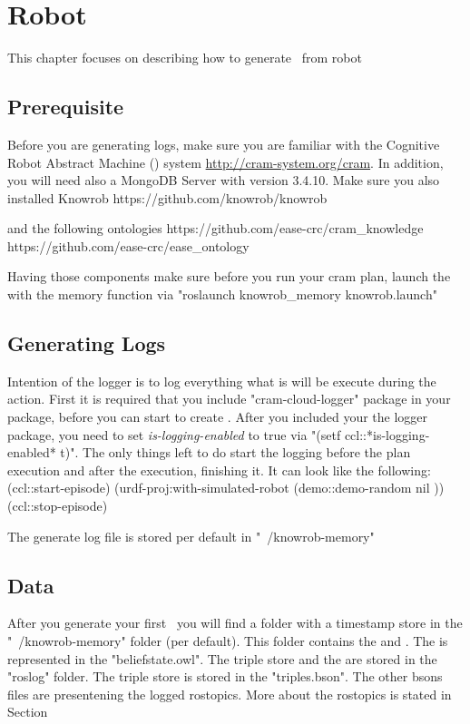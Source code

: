 \section{Robot \neems}

This chapter focuses on describing how to generate \neems~from robot 

\subsection{Prerequisite}

Before you are generating logs, make sure you are familiar with the Cognitive Robot Abstract Machine (\cram) system \url{http://cram-system.org/cram}.
In addition, you will need also a MongoDB Server with version 3.4.10.
Make sure you also installed Knowrob
https://github.com/knowrob/knowrob

and the following ontologies
https://github.com/ease-crc/cram\_knowledge
https://github.com/ease-crc/ease\_ontology

Having those components make sure before you run your cram plan, launch the \knowrob with the memory function via "roslaunch knowrob\_memory knowrob.launch"



\subsection{Generating Logs}
Intention of the logger is to log everything what is will be execute during the \cram action.
First it is required that you include "cram-cloud-logger" package in your \cram package, before you can start to create \neems.
After you included your the logger package, you need to set \textit{is-logging-enabled} to true via "(setf ccl::*is-logging-enabled* t)".
The only things left to do start the logging before the plan execution and after the execution, finishing it.
It can look like the following:
	(ccl::start-episode)
	(urdf-proj:with-simulated-robot (demo::demo-random nil ))
	(ccl::stop-episode)
	
The generate log file is stored per default in "~/knowrob-memory" 

\subsection{Data}
After you generate your first \neem~you will find a folder with a timestamp store in the "~/knowrob-memory" folder (per default).
This folder contains the \neemnar and \neemexp . The \neemnar is represented in the "beliefstate.owl". The triple store and the \neemexp are stored in the "roslog" folder. The triple store is stored in the "triples.bson". The other bsons files are presentening the logged rostopics. More about the rostopics is stated in Section 

